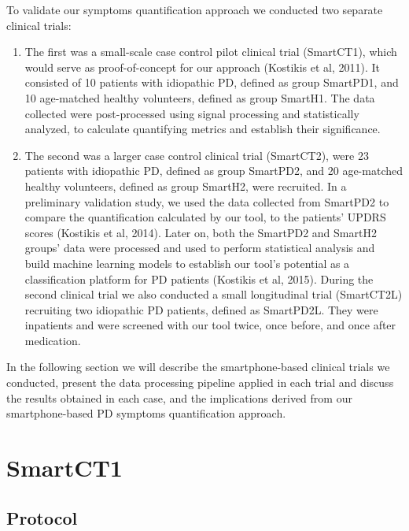 To validate our symptoms quantification approach we conducted two separate clinical trials: 

\begin{enumerate}
\item The first was a small-scale case control pilot clinical trial (\gls{SmartCT1}), which would serve as proof-of-concept for our approach (Kostikis et al, 2011). It consisted of 10 patients with idiopathic \gls{PD}, defined as group \gls{SmartPD1}, and 10 age-matched healthy volunteers, defined as group \gls{SmartH1}. The data collected were post-processed using signal processing and statistically analyzed, to calculate quantifying metrics and establish their significance. 
\item The second was a larger case control clinical trial (\gls{SmartCT2}), were 23 patients with idiopathic \gls{PD}, defined as group \gls{SmartPD2}, and 20 age-matched healthy volunteers, defined as group \gls{SmartH2}, were recruited. In a preliminary validation study, we used the data collected from \gls{SmartPD2} to compare the quantification calculated by our tool, to the patients' \gls{UPDRS} scores (Kostikis et al, 2014). Later on, both the \gls{SmartPD2} and \gls{SmartH2} groups' data were processed and used to perform statistical analysis and build machine learning models to establish our tool's potential as a classification platform for \gls{PD} patients (Kostikis et al, 2015). During the second clinical trial we also conducted a small longitudinal trial (\gls{SmartCT2L}) recruiting two idiopathic \gls{PD} patients, defined as \gls{SmartPD2L}. They were inpatients and were screened with our tool twice, once before, and once after medication. 
\end{enumerate}

In the following section we will describe the smartphone-based clinical trials we conducted, present the data processing pipeline applied in each trial and discuss the results obtained in each case, and the implications derived from our smartphone-based \gls{PD} symptoms quantification approach. 

\section{SmartCT1}
\label{sec:SmartCT1}

\subsection{Protocol}
\label{subsec:SmartCT1Protocol}


